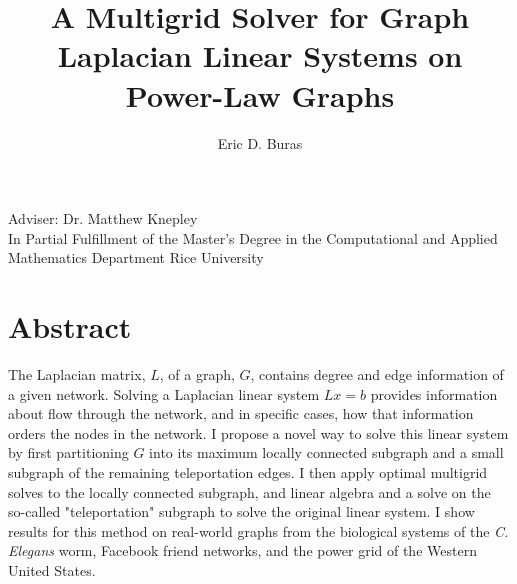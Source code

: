 \documentclass{article}
\begin{document}
\title{A Multigrid Solver for Graph Laplacian Linear Systems on Power-Law Graphs}
\author{Eric D. Buras}


\maketitle
\begin{center}
Adviser: Dr. Matthew Knepley\\
In Partial Fulfillment of the Master's Degree in the Computational and Applied Mathematics Department Rice University\\
\end{center}
\vspace{15 mm}
\section{Abstract}
\begin{spacing}{1}
The Laplacian matrix, $L$, of a graph, $G$, contains degree and edge information of a given network. Solving a Laplacian linear system $Lx = b$ provides information about flow through the network, and in specific cases, how that information orders the nodes in the network. I propose a novel way to solve this linear system by first partitioning $G$ into its maximum locally connected subgraph and a small subgraph of the remaining teleportation edges. I then apply optimal multigrid solves to the locally connected subgraph, and linear algebra and a solve on the so-called "teleportation" subgraph to solve the original linear system. I show results for this method on real-world graphs from the biological systems of the \textit{C. Elegans} worm, Facebook friend networks, and the power grid of the Western United States.
\end{spacing}

%
%
\end{document}
